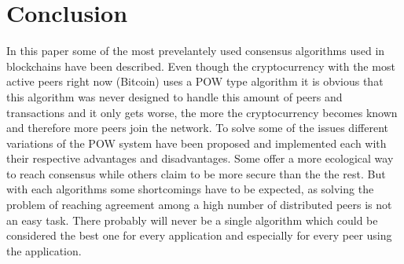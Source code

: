 \section{Conclusion}

In this paper some of the most prevelantely used consensus algorithms used in blockchains have been described. Even though the cryptocurrency with the most active peers right now (Bitcoin) uses
a POW type algorithm it is obvious that this algorithm was never designed to handle this amount of peers and transactions and it only gets worse, the more the cryptocurrency becomes known and therefore
more peers join the network. To solve some of the issues different variations of the POW system have been proposed and implemented each with their respective advantages and disadvantages.
Some offer a more ecological way to reach consensus while others claim to be more secure than the the rest. But with each algorithms some shortcomings have to be expected, as solving the problem
of reaching agreement among a high number of distributed peers is not an easy task. There probably will never be a single algorithm which could be considered the best one for every application
and especially for every peer using the application.
